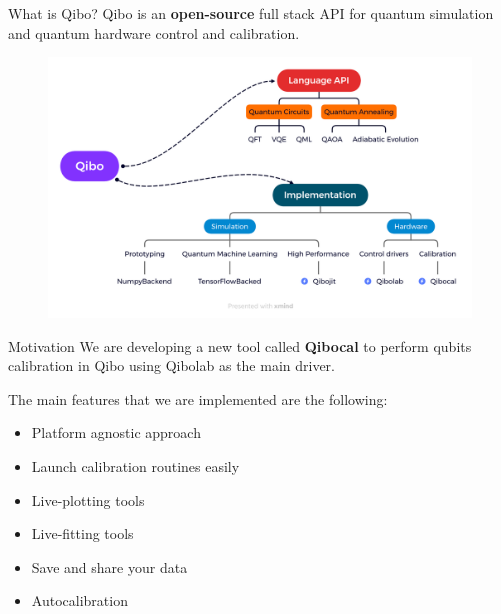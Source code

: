 \documentclass[11p,aspectratio=169]{beamer}
\begin{document}

\begin{frame}{What is Qibo?}
    Qibo is an \textbf{open-source} full stack API for quantum simulation and quantum hardware control and calibration.
    \begin{figure}
        \includegraphics[width= \textwidth]{figures/Qibo.png}
    \end{figure}
\end{frame}

\begin{frame}{Motivation}
    We are developing a new tool called {\color{blue} \textbf{Qibocal}} to perform qubits calibration in Qibo using Qibolab as the main driver.
    
    The main features that we are implemented are the following:


    \begin{multicols*}{2}
        \begin{itemize}
            \item[\faCaretSquareORight] Platform agnostic approach
            \item[\faCaretSquareORight] Launch calibration routines easily
            \item[\faCaretSquareORight] Live-plotting tools
            \item[\faCaretSquareORight] Live-fitting tools
            \item[\faCaretSquareORight] Save and share your data
            \item[\faCaretSquareORight] Autocalibration
        \end{itemize}
    \end{multicols*}
\end{frame}
\end{document}
